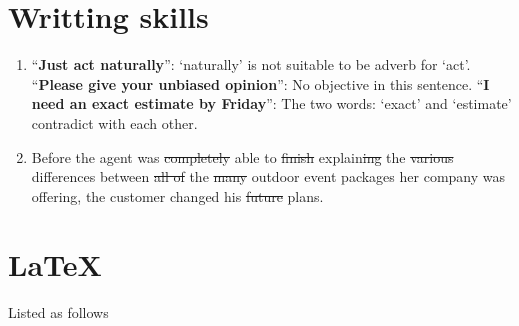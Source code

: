\documentclass[paper=a4, fontsize=11pt]{scrartcl} %
\numberwithin{equation}{section} %
\numberwithin{figure}{section} %
\numberwithin{table}{section} %
\begin{document}
			
\section{Writting skills}
	\begin{enumerate}
		\item 
			``\textbf{Just act naturally}'': `naturally' is not suitable to be adverb for `act'.\newline
			``\textbf{Please give your unbiased opinion}'': No objective in this sentence.\newline
			``\textbf{I need an exact estimate by Friday}'': The two words: `exact' and `estimate' contradict with each other.

		\item 
			Before the agent was \sout{completely} able to \sout{finish} explain\sout{ing} the \sout{various} differences between \sout{all of} the \sout{many} outdoor event packages her company was offering, the customer changed his \sout{future} plans.
	\end{enumerate}

\section{\LaTeX}
	Listed as follows
	
\end{document}
